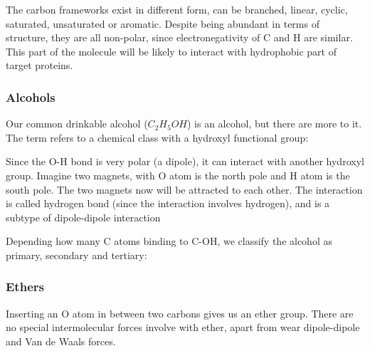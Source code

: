 \documentclass{report}
\begin{document}
		The carbon frameworks exist in different form, can be branched, linear, cyclic, saturated, unsaturated or aromatic. Despite being abundant in terms of structure, they are all non-polar, since electronegativity of C and H are similar. This part of the molecule will be likely to interact with hydrophobic part of target proteins. \\
		
		\subsubsection{Alcohols}
		Our common drinkable alcohol ($C_2H_5OH$) is an alcohol, but there are more to it. The term refers to a chemical class with a hydroxyl functional group:
		\begin{center}
			 \hfill
		\end{center}
		Since the O-H bond is very polar (a dipole), it can interact with another hydroxyl group. Imagine two magnets, with O atom is the north pole and H atom is the south pole. The two magnets now will be attracted to each other. The interaction is called hydrogen bond (since the interaction involves hydrogen), and is a subtype of dipole-dipole interaction 
		\begin{center}
		\end{center}
		Depending how many C atoms binding to C-OH, we classify the alcohol as primary, secondary and tertiary:
		\begin{center}
			 \hfill
			 \hfill
		\end{center}
		
		\subsubsection{Ethers}
		Inserting an O atom in between two carbons gives us an ether group. There are no special intermolecular forces involve with ether, apart from wear dipole-dipole and Van de Waals forces.
		\begin{center}
		\end{center}
		
\end{document}
